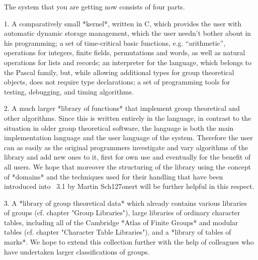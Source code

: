 The system that you are getting now consists of four parts.
\beginlist
  \item{1.}
    A comparatively small *kernel*, written in C, which provides the user
    with
    \itemitem{-}
      automatic dynamic storage management, which the user needn't bother
      about in his programming;
    \itemitem{-}
      a   set of  time-critical basic   functions, e.g.   ``arithmetic'',
      operations for integers, finite fields,  permutations and words, as
      well as natural operations for lists and records;
    \itemitem{-}
      an interpreter for the {\GAP} language, which belongs to the Pascal
      family, but, while  allowing additional types for group theoretical
      objects, does not require type declarations;
    \itemitem{-}
      a   set  of programming tools  for   testing, debugging, and timing
      algorithms.

  \item{2.}
    A   much larger *library of    {\GAP} functions* that implement group
    theoretical and other algorithms.  Since  this is written entirely in
    the  {\GAP} language, in contrast  to  the situation  in older  group
    theoretical   software, the  {\GAP}    language   is both   the  main
    implementation language   and  the  user  language of   the   system.
    Therefore  the  user can    as easily  as  the  original  programmers
    investigate  and vary algorithms of  the library and  add new ones to
    it, first for own  use and eventually for  the benefit of  all {\GAP}
    users.  We hope  that moreover the  structuring of the  library using
    the concept of  *domains* and the techniques  used for their handling
    that have   been   introduced     into   {\GAP}~3.1    by      Martin
    Sch\accent127onert will be further helpful in this respect.

  \item{3.}
    A *library of group  theoretical data* which already contains various
    libraries of groups  (cf. chapter "Group Libraries"), large libraries
    of  ordinary character tables, including all  of the Cambridge *Atlas
    of  Finite Groups* and modular tables  (cf.  chapter "Character Table
    Libraries"), and a *library  of tables of  marks*. We hope to  extend
    this  collection further  with  the   help  of colleagues  who   have
    undertaken larger classifications of groups.

